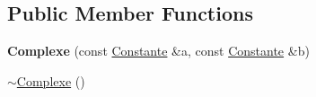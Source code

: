 \subsection*{\-Public \-Member \-Functions}
\begin{DoxyCompactItemize}
\item 
\hypertarget{class_l_o21_1_1_complexe_ae9949fb1e28f1b232c83acafecf67d33}{{\bfseries \-Complexe} (const \hyperlink{class_l_o21_1_1_constante}{\-Constante} \&a, const \hyperlink{class_l_o21_1_1_constante}{\-Constante} \&b)}\label{class_l_o21_1_1_complexe_ae9949fb1e28f1b232c83acafecf67d33}

\item 
\hypertarget{class_l_o21_1_1_complexe_ac92996231047d39d40e11384bb9311b6}{\hyperlink{class_l_o21_1_1_complexe_ac92996231047d39d40e11384bb9311b6}{$\sim$\-Complexe} ()}\label{class_l_o21_1_1_complexe_ac92996231047d39d40e11384bb9311b6}


\end{DoxyCompactItemize}

